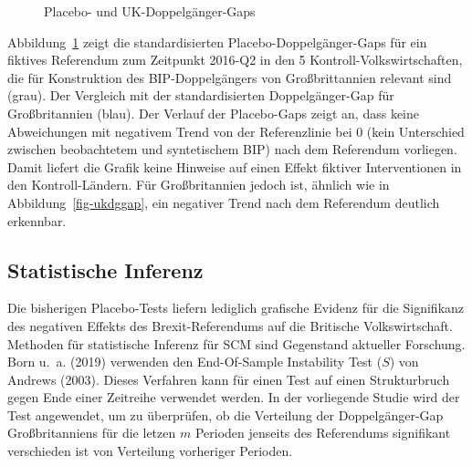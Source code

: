\documentclass[
  a4paper,
  DIV=11,
  oneside]{scrreprt}
\begin{document}
\begin{figure}[t]


\caption{\label{fig-pdgukg}Placebo- und UK-Doppelgänger-Gaps}

\end{figure}%

Abbildung~\ref{fig-pdgukg} zeigt die standardisierten
Placebo-Doppelgänger-Gaps für ein fiktives Referendum zum Zeitpunkt
2016-Q2 in den 5 Kontroll-Volkswirtschaften, die für Konstruktion des
BIP-Doppelgängers von Großbrittannien relevant sind (grau). Der
Vergleich mit der standardisierten Doppelgänger-Gap für Großbritannien
(blau). Der Verlauf der Placebo-Gaps zeigt an, dass keine Abweichungen
mit negativem Trend von der Referenzlinie bei 0 (kein Unterschied
zwischen beobachtetem und syntetischem BIP) nach dem Referendum
vorliegen. Damit liefert die Grafik keine Hinweise auf einen Effekt
fiktiver Interventionen in den Kontroll-Ländern. Für Großbritannien
jedoch ist, ähnlich wie in Abbildung~\ref{fig-ukdggap}, ein negativer
Trend nach dem Referendum deutlich erkennbar.

\subsection{Statistische Inferenz}\label{statistische-inferenz}

Die bisherigen Placebo-Tests liefern lediglich grafische Evidenz für die
Signifikanz des negativen Effekts des Brexit-Referendums auf die
Britische Volkswirtschaft. Methoden für statistische Inferenz für SCM
sind Gegenstand aktueller Forschung. Born u.~a. (2019) verwenden den
End-Of-Sample Instability Test (\(S\)) von Andrews (2003). Dieses
Verfahren kann für einen Test auf einen Strukturbruch gegen Ende einer
Zeitreihe verwendet werden. In der vorliegende Studie wird der Test
angewendet, um zu überprüfen, ob die Verteilung der Doppelgänger-Gap
Großbritanniens für die letzen \(m\) Perioden jenseits des Referendums
signifikant verschieden ist von Verteilung vorheriger Perioden.
\end{document}
